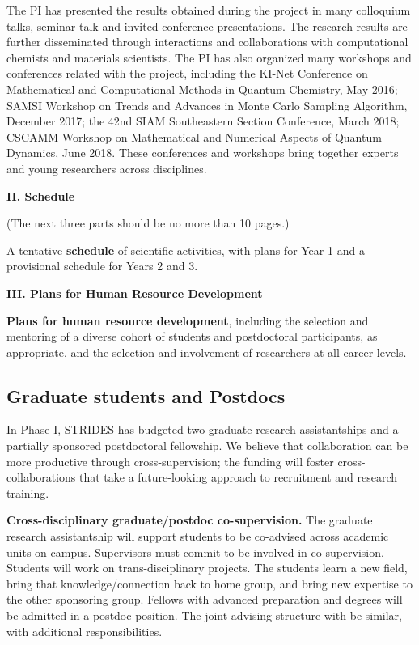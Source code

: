 \documentclass[12pt]{article}
\begin{document}
The PI has presented the results obtained during the project in many
colloquium talks, seminar talk and invited conference
presentations. The research results are further disseminated through
interactions and collaborations with computational chemists and
materials scientists. The PI has also organized many workshops and
conferences related with the project, including the KI-Net Conference
on Mathematical and Computational Methods in Quantum Chemistry, May
2016; SAMSI Workshop on Trends and Advances in Monte Carlo Sampling
Algorithm, December 2017; the 42nd SIAM Southeastern Section
Conference, March 2018; CSCAMM Workshop on Mathematical and Numerical
Aspects of Quantum Dynamics, June 2018. These conferences and
workshops bring together experts and young researchers across
disciplines.




\clearpage


\begin{center}
{\bf\large II. Schedule}
\end{center}

(The next three parts should be no more than 10 pages.)

A tentative {\bf schedule} of scientific activities, with plans for Year 1 and a provisional schedule for Years 2 and 3.


\clearpage


\begin{center}
{\bf\large III. Plans for Human Resource Development}
\end{center}


{\bf Plans for human resource development}, including the selection and mentoring of a diverse cohort of students and postdoctoral participants, as appropriate, and the selection and involvement of researchers at all career levels.


\subsection{Graduate students and Postdocs}
\label{sec:gra-postdoc}

In Phase I, STRIDES has budgeted two graduate research assistantships and a partially sponsored postdoctoral fellowship.
We believe that collaboration can be more productive through cross-supervision; the funding will foster cross-collaborations that take a future-looking approach to recruitment and research training.

\medskip
\noindent
{\bf Cross-disciplinary graduate/postdoc co-supervision.}
The graduate research assistantship will support students to be co-advised across academic units on campus.
Supervisors must commit to be involved in co-supervision.
Students will work on trans-disciplinary projects.
The students learn a new field, bring that knowledge/connection back to home group, and bring new expertise to the other sponsoring group.
Fellows with advanced preparation and degrees will be admitted in a postdoc position.
The joint advising structure with be similar, with additional responsibilities.
\end{document}
